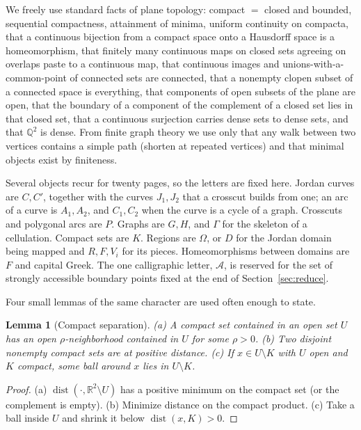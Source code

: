 \documentclass[11pt,a4paper]{article}
\theoremstyle{jsplain}
\newtheorem{lemma}[theorem]{Lemma}
\theoremstyle{jsdefn}
\newcommand{\dist}{\operatorname{dist}}
\begin{document}
We freely use standard facts of plane topology: compact
$=$ closed and bounded, sequential compactness, attainment of minima,
uniform continuity on compacta, that a continuous bijection from a
compact space onto a Hausdorff space is a homeomorphism, that finitely
many continuous maps on closed sets agreeing on overlaps paste to a
continuous map, that continuous images and unions-with-a-common-point
of connected sets are connected, that a nonempty clopen subset of a
connected space is everything, that components of open subsets of the
plane are open, that the boundary of a component of the complement of
a closed set lies in that closed set, that a continuous surjection
carries dense sets to dense sets, and that $\mathbb Q^2$ is dense.
From finite graph theory we use only that any walk between two
vertices contains a simple path (shorten at repeated vertices) and
that minimal objects exist by finiteness.

Several objects recur for twenty pages, so the letters are fixed here.
Jordan curves are $C,C'$, together with the curves $J_1,J_2$ that a
crosscut builds from one; an arc of a curve is $A_1,A_2$, and $C_1,C_2$
when the curve is a cycle of a graph. Crosscuts and polygonal arcs are
$P$. Graphs are $G,H$, and $\Gamma$ for the skeleton of a cellulation.
Compact sets are $K$. Regions are $\Omega$, or $D$ for the Jordan domain
being mapped and $R,F,V_i$ for its pieces. Homeomorphisms between
domains are $F$ and capital Greek. The one calligraphic letter,
$\mathcal A$, is reserved for the set of strongly accessible boundary
points fixed at the end of Section~\ref{sec:reduce}.

Four small lemmas of the same character are used often enough to
state.

\begin{lemma}[Compact separation]\label{lem:sep}
\textup{(a)} A compact set contained in an open set $U$ has an open
$\rho$-neighborhood contained in $U$ for some $\rho>0$.
\textup{(b)} Two disjoint nonempty compact sets are at positive
distance.
\textup{(c)} If $x\in U\setminus K$ with $U$ open and $K$ compact,
some ball around $x$ lies in $U\setminus K$.
\end{lemma}
\begin{proof}
(a) $\dist(\cdot,\mathbb R^2\setminus U)$ has a positive minimum on
the compact set (or the complement is empty). (b) Minimize distance on
the compact product. (c) Take a ball inside $U$ and shrink it below
$\dist(x,K)>0$.
\end{proof}
\end{document}
